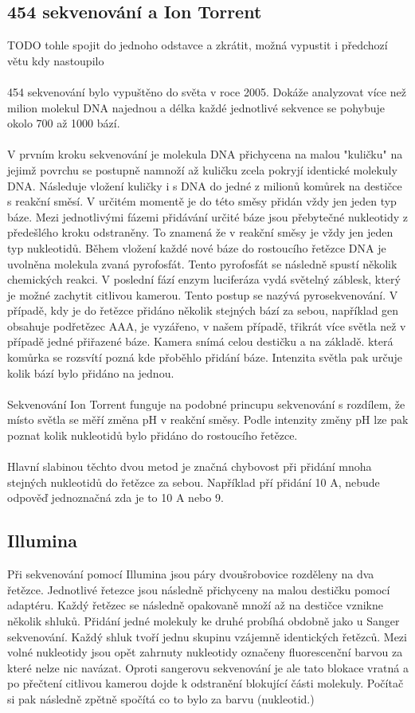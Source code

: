 \documentclass[czech,DP]{thesiskiv}
\numberwithin{equation}{section}
\begin{document}
\subsection{454 sekvenování a Ion Torrent}
TODO tohle spojit do jednoho odstavce a zkrátit, možná vypustit i předchozí větu kdy nastoupilo
\\
\\
454 sekvenování bylo vypuštěno do světa v roce 2005. Dokáže analyzovat více než milion molekul DNA najednou a délka každé jednotlivé sekvence se pohybuje okolo 700 až 1000 bází.
\\
\\
V prvním kroku sekvenování je molekula DNA přichycena na malou "kuličku" na jejimž povrchu se postupně namnoží až kuličku zcela pokryjí identické molekuly DNA. Následuje vložení kuličky i s DNA do jedné z milionů komůrek na destičce s reakční směsí. V určitém momentě je do této směsy přidán vždy jen jeden typ báze. Mezi jednotlivými fázemi přidávání určité báze jsou přebytečné nukleotidy z předešlého kroku odstraněny. To znamená že v reakční směsy je vždy jen jeden typ nukleotidů. Během vložení každé nové báze do rostoucího řetězce DNA je uvolněna molekula zvaná pyrofosfát.  Tento pyrofosfát se následně spustí několik chemických reakci. V poslední fází enzym luciferáza vydá světelný záblesk, který je možné zachytit citlivou kamerou.  Tento postup se nazývá pyrosekvenování. V případě, kdy je do řetězce přidáno několik stejných bází za sebou, například gen obsahuje podřetězec AAA, je vyzářeno, v našem případě, třikrát více světla než v případě jedné přiřazené báze. Kamera snímá celou destičku a na základě. která komůrka se rozsvítí pozná kde přoběhlo přidání báze. Intenzita světla pak určuje kolik bází bylo přidáno na jednou. 
\\
\\
Sekvenování Ion Torrent funguje na podobné princupu sekvenování s rozdílem, že místo světla se měří změna pH v reakční směsy. Podle intenzity změny pH lze pak poznat kolik nukleotidů bylo přidáno do rostoucího řetězce.
\\
\\
Hlavní slabinou těchto dvou metod je značná chybovost při přidání mnoha stejných nukleotidů do řetězce za sebou. Například pří přidání 10 A, nebude odpověď jednoznačná zda je to 10 A nebo 9.


\subsection{Illumina}
Při sekvenování pomocí Illumina jsou páry dvoušrobovice rozděleny na dva řetězce. Jednotlivé řetezce jsou následně přichyceny na malou destičku pomocí adaptéru. Každý řetězec se následně opakovaně množí až na destičce vznikne několik shluků. Přidání jedné molekuly ke druhé probíhá obdobně jako u Sanger sekvenování. Každý shluk tvoří jednu skupinu vzájemně identických řetězců. Mezi volné nukleotidy jsou opět zahrnuty nukleotidy označeny fluorescenční barvou za které nelze nic navázat. Oproti sangerovu sekvenování je ale tato blokace vratná a po přečtení citlivou kamerou dojde k odstranění blokující části molekuly. Počítač si pak následně zpětně spočítá co to bylo za barvu (nukleotid.) 
\end{document}
